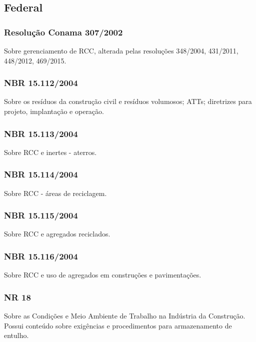 \subsection{Federal}
\begin{subapend}
	\begin{subsubapend}
		\item \subsubsection{Resolução Conama 307/2002}
		Sobre gerenciamento de RCC, alterada pelas resoluções 348/2004, 431/2011, 448/2012, 469/2015.
		\subsubsection{NBR 15.112/2004}
		Sobre os resíduos da construção civil e resíduos volumosos; ATTs; diretrizes para projeto, implantação e operação.
		\subsubsection{NBR 15.113/2004}
		Sobre RCC e inertes - aterros.
		\subsubsection{NBR 15.114/2004}
		Sobre RCC - áreas de reciclagem.
		\subsubsection{NBR 15.115/2004}
		Sobre RCC e agregados reciclados.
		\subsubsection{NBR 15.116/2004}
		Sobre RCC e uso de agregados em construções e pavimentações.
		\subsubsection{NR 18}
		Sobre as Condições e Meio Ambiente de Trabalho na Indústria da Construção. Possui conteúdo sobre exigências e procedimentos para armazenamento de entulho.
	\end{subsubapend}
\end{subapend}


